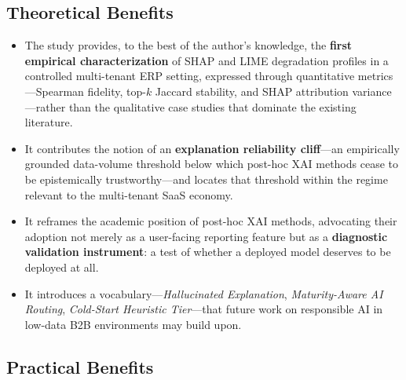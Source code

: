 \subsection{Theoretical Benefits}
\label{subsec:theoretical_benefits}

\begin{itemize}
  \item The study provides, to the best of the author's knowledge, the \textbf{first empirical characterization} of SHAP and LIME degradation profiles in a controlled multi-tenant ERP setting, expressed through quantitative metrics---Spearman fidelity, top-$k$ Jaccard stability, and SHAP attribution variance---rather than the qualitative case studies that dominate the existing literature.

  \item It contributes the notion of an \textbf{explanation reliability cliff}---an empirically grounded data-volume threshold below which post-hoc XAI methods cease to be epistemically trustworthy---and locates that threshold within the regime relevant to the multi-tenant SaaS economy.

  \item It reframes the academic position of post-hoc XAI methods, advocating their adoption not merely as a user-facing reporting feature but as a \textbf{diagnostic validation instrument}: a test of whether a deployed model deserves to be deployed at all.

  \item It introduces a vocabulary---\emph{Hallucinated Explanation}, \emph{Maturity-Aware AI Routing}, \emph{Cold-Start Heuristic Tier}---that future work on responsible AI in low-data B2B environments may build upon.
\end{itemize}

\subsection{Practical Benefits}
\label{subsec:practical_benefits}

